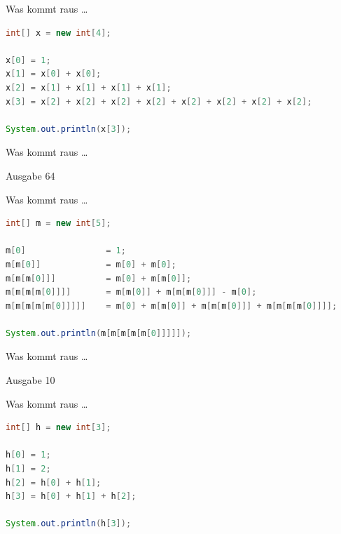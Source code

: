 \documentclass[18pt]{beamer}
\begin{document}
\begin{frame}[fragile]{Was kommt raus \dots}
    \begin{lstlisting}[language=Java,basicstyle=\scriptsize]
int[] x = new int[4];

x[0] = 1;
x[1] = x[0] + x[0];
x[2] = x[1] + x[1] + x[1] + x[1];
x[3] = x[2] + x[2] + x[2] + x[2] + x[2] + x[2] + x[2] + x[2];

System.out.println(x[3]);
    \end{lstlisting}

\end{frame}

\begin{frame}{Was kommt raus \dots}
    \begin{exampleblock}{Ausgabe}
        64
    \end{exampleblock}
\end{frame}


\begin{frame}[fragile]{Was kommt raus \dots}
    \begin{lstlisting}[language=Java,basicstyle=\scriptsize]
int[] m = new int[5];

m[0]                = 1;
m[m[0]]             = m[0] + m[0];
m[m[m[0]]]          = m[0] + m[m[0]];
m[m[m[m[0]]]]       = m[m[0]] + m[m[m[0]]] - m[0];
m[m[m[m[m[0]]]]]    = m[0] + m[m[0]] + m[m[m[0]]] + m[m[m[m[0]]]];

System.out.println(m[m[m[m[m[0]]]]]);
    \end{lstlisting}

\end{frame}

\begin{frame}{Was kommt raus \dots}
    \begin{exampleblock}{Ausgabe}
        10
    \end{exampleblock}
\end{frame}

\begin{frame}[fragile]{Was kommt raus \dots}
    \begin{lstlisting}[language=Java,basicstyle=\scriptsize]
int[] h = new int[3];

h[0] = 1;
h[1] = 2;
h[2] = h[0] + h[1];
h[3] = h[0] + h[1] + h[2];

System.out.println(h[3]);
    \end{lstlisting}

\end{frame}
\end{document}
